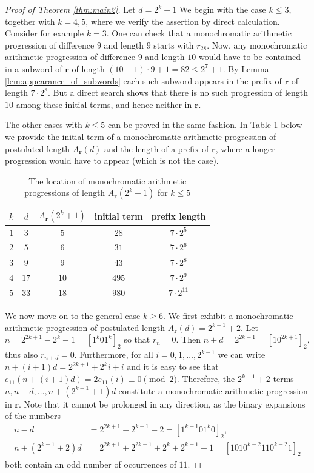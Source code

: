 \documentclass[a4paper,11pt]{amsart}
\theoremstyle{definition}
\begin{document}
\begin{proof}[Proof of Theorem \ref{thm:main2}]
Let $d = 2^k+1$
We begin with the case $k \leq 3$, together with $k=4,5$, where we verify the assertion by direct calculation. Consider for example $k=3$. One can check that a monochromatic arithmetic progression of difference $9$ and length $9$ starts with $r_{28}$. Now, any monochromatic arithmetic progression of difference $9$ and length $10$ would have to be contained in a subword of $\mathbf{r}$ of length $(10-1) \cdot 9 + 1 = 82 \leq 2^7+1$. By Lemma \ref{lem:appearance_of_subwords} each such subword appears in the prefix of $\mathbf{r}$ of length $7 \cdot 2^{8}$. But a direct search shows that there is no such progression of length $10$ among these initial terms, and hence neither in $\mathbf{r}$.

The other cases with $k \leq 5$ can be proved in the same fashion. In Table \ref{tab:progressions1} below we provide the initial term of a monochromatic arithmetic progression of postulated length $A_{\mathbf{r}}(d)$ and the length of a prefix of $\mathbf{r}$, where a longer progression would have to appear (which is not the case). 

\begin{table}[h] 
\begin{tabular}{ccccc}
$k$ & $d$  & $A_{\mathbf{r}}(2^k+1)$ & initial term & prefix length \\ \hline
$1$ & $3$  & $5$    & $28$     & $7 \cdot 2^5$         \\
$2$ & $5$  & $6$    & $31$     & $7 \cdot 2^6$         \\
$3$ & $9$  & $9$    & $43$     & $7 \cdot 2^{8}$      \\
$4$ & $17$ & $10$   & $495$    & $7 \cdot 2^{9}$      \\
$5$ & $33$ & $18$   & $980$    & $7 \cdot 2^{11}$     
\end{tabular} 
\caption{\label{tab:progressions1}The location of monochromatic arithmetic progressions of length $A_{\mathbf{r}}(2^k+1)$ for $k \leq 5$}
\end{table}

We now move on to the general case $k \geq 6$. We first exhibit a monochromatic arithmetic progression of postulated length $A_{\mathbf{r}}(d) = 2^{k-1}+2$. Let $n = 2^{2k+1}- 2^k-1 =[1^{k} 0 1^{k}]_2$ so that $r_n =  0$. Then $n+d = 2^{2k+1} = [1 0^{2k+1}]_2$, thus also $r_{n+d} =  0$. Furthermore, for all $i=0,1,\ldots, 2^{k-1} $ we can write $n + (i+1)d = 2^{2k+1} + 2^k i  + i$ and it is easy to see that $e_{11}(n + (i+1)d) = 2 e_{11}(i) \equiv 0 \pmod{2}$. Therefore, the $2^{k-1} + 2$ terms $n, n+d, \ldots, n+ (2^{k-1}+1)d$ 
constitute a monochromatic arithmetic progression in $\mathbf{r}$. Note that it cannot be prolonged in any direction, as the binary expansions of the numbers
\begin{align*}
n-d &= 2^{2k+1}- 2^{k+1}- 2 =[1^{k-1} 0 1^{k} 0]_2, \\
n+ (2^{k-1}+2)d &= 2^{2k+1} + 2^{2k-1} + 2^k + 2^{k-1} + 1 = [101 0^{k-2} 11 0^{k-2} 1]_2
\end{align*}
both contain an odd number of occurrences of $11$.


\end{proof}
\end{document}
